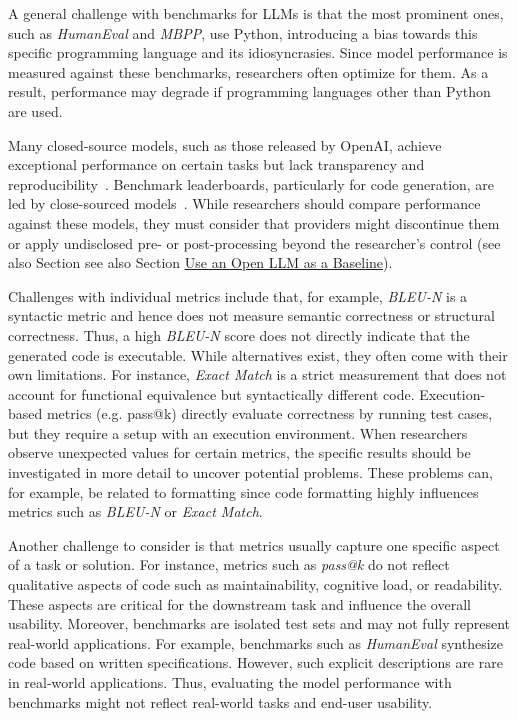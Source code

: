A general challenge with benchmarks for LLMs is that the most prominent ones, such as \emph{HumanEval} and \emph{MBPP}, use Python, introducing a bias towards this specific programming language and its idiosyncrasies.
Since model performance is measured against these benchmarks, researchers often optimize for them.
As a result, performance may degrade if programming languages other than Python are used.

Many closed-source models, such as those released by OpenAI, achieve exceptional performance on certain tasks but lack transparency and reproducibility~\cite{DBLP:conf/nips/00110ZZDJLHL24, DBLP:journals/corr/abs-2308-01861, DBLP:journals/corr/abs-2406-15877}.
Benchmark leaderboards, particularly for code generation, are led by close-sourced models~\cite{DBLP:journals/corr/abs-2308-01861, DBLP:journals/corr/abs-2406-15877}.
While researchers should compare performance against these models, they must consider that providers might discontinue them or apply undisclosed pre- or post-processing beyond the researcher's control (see also Section see also Section \href{/guidelines/#use-an-open-llm-as-a-baseline}{Use an Open LLM as a Baseline}).

Challenges with individual metrics include that, for example, \emph{BLEU-N} is a syntactic metric and hence does not measure semantic correctness or structural correctness.
Thus, a high \emph{BLEU-N} score does not directly indicate that the generated code is executable.
While alternatives exist, they often come with their own limitations.
For instance, \emph{Exact Match} is a strict measurement that does not account for functional equivalence but syntactically different code.
Execution-based metrics (e.g. pass@k) directly evaluate correctness by running test cases, but they require a setup with an execution environment.
When researchers observe unexpected values for certain metrics, the specific results should be investigated in more detail to uncover potential problems.
These problems can, for example, be related to formatting since code formatting highly influences metrics such as \emph{BLEU-N} or \emph{Exact Match}.

Another challenge to consider is that metrics usually capture one specific aspect of a task or solution.
For instance, metrics such as \emph{pass@k} do not reflect qualitative aspects of code such as maintainability, cognitive load, or readability.
These aspects are critical for the downstream task and influence the overall usability.
Moreover, benchmarks are isolated test sets and may not fully represent real-world applications.
For example, benchmarks such as \emph{HumanEval} synthesize code based on written specifications.
However, such explicit descriptions are rare in real-world applications.
Thus, evaluating the model performance with benchmarks might not reflect real-world tasks and end-user usability.

